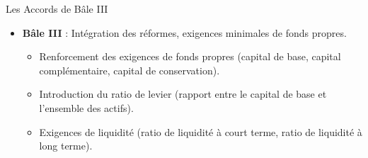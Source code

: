 \begin{frame}{Les Accords de Bâle III}
    \begin{itemize}
        \item \textbf{Bâle III} : Intégration des réformes, exigences minimales de fonds propres.
            \begin{itemize}
                \item Renforcement des exigences de fonds propres (capital de base, capital complémentaire, capital de conservation).
                \item Introduction du ratio de levier (rapport entre le capital de base et l'ensemble des actifs).
                \item Exigences de liquidité (ratio de liquidité à court terme, ratio de liquidité à long terme).
            \end{itemize}
    \end{itemize}
\end{frame}
